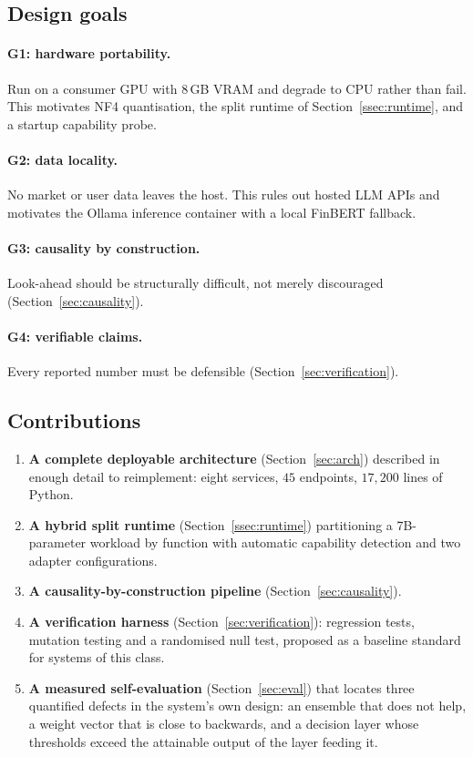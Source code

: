 \documentclass[preprint,12pt,authoryear]{elsarticle}
\begin{document}
\subsection{Design goals}

\paragraph{G1: hardware portability.} Run on a consumer GPU with 8\,GB VRAM and
degrade to CPU rather than fail. This motivates NF4 quantisation, the split
runtime of Section~\ref{ssec:runtime}, and a startup capability probe.

\paragraph{G2: data locality.} No market or user data leaves the host. This rules
out hosted LLM APIs and motivates the Ollama inference container with a local
FinBERT fallback.

\paragraph{G3: causality by construction.} Look-ahead should be structurally
difficult, not merely discouraged (Section~\ref{sec:causality}).

\paragraph{G4: verifiable claims.} Every reported number must be defensible
(Section~\ref{sec:verification}).

\subsection{Contributions}

\begin{enumerate}
    \item \textbf{A complete deployable architecture}
    (Section~\ref{sec:arch}) described in enough detail to reimplement: eight
    services, $45$ endpoints, $17{,}200$ lines of Python.
    \item \textbf{A hybrid split runtime} (Section~\ref{ssec:runtime})
    partitioning a 7B-parameter workload by function with automatic capability
    detection and two adapter configurations.
    \item \textbf{A causality-by-construction pipeline}
    (Section~\ref{sec:causality}).
    \item \textbf{A verification harness} (Section~\ref{sec:verification}):
    regression tests, mutation testing and a randomised null test, proposed as a
    baseline standard for systems of this class.
    \item \textbf{A measured self-evaluation} (Section~\ref{sec:eval}) that
    locates three quantified defects in the system's own design: an ensemble
    that does not help, a weight vector that is close to backwards, and a
    decision layer whose thresholds exceed the attainable output of the layer
    feeding it.
\end{enumerate}
\end{document}
